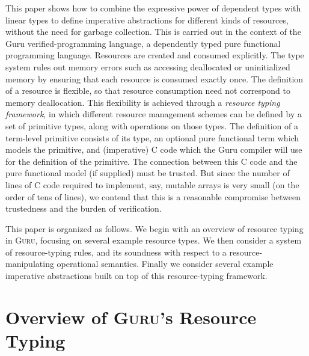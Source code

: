 \documentclass[9pt,natbib]{sigplanconf}
\begin{document}
This paper shows how to combine the expressive power of dependent
types with linear types to define imperative abstractions for
different kinds of resources, without the need for garbage collection.
This is carried out in the context of the Guru verified-programming
language, a dependently typed pure functional programming language.
Resources are created and consumed explicitly.  The type system rules
out memory errors such as accessing deallocated or uninitialized
memory by ensuring that each resource is consumed exactly once.  The
definition of a resource is flexible, so that resource consumption
need not correspond to memory deallocation.  This flexibility is
achieved through a \emph{resource typing framework}, in which
different resource management schemes can be defined by a set of
primitive types, along with operations on those types.  The definition
of a term-level primitive consists of its type, an optional pure
functional term which models the primitive, and (imperative) C code
which the Guru compiler will use for the definition of the primitive.
The connection between this C code and the pure functional model (if
supplied) must be trusted.  But since the number of lines of C code
required to implement, say, mutable arrays is very small (on the order
of tens of lines), we contend that this is a reasonable compromise
between trustedness and the burden of verification.

This paper is organized as follows.  We begin with an overview of
resource typing in \textsc{Guru}, focusing on several example resource
types.  We then consider a system of resource-typing rules, and its
soundness with respect to a resource-manipulating operational
semantics.  Finally we consider several example imperative
abstractions built on top of this resource-typing framework.

\section{Overview of \textsc{Guru}'s Resource Typing}
\end{document}
